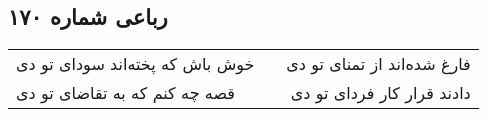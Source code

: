 \begin{center}
\section*{رباعی شماره ۱۷۰}
\label{sec:sh170}
\begin{longtable}{l p{0.5cm} r}
خوش باش که پخته‌اند سودای تو دی
&&
فارغ شده‌اند از تمنای تو دی
\\
قصه چه کنم که به تقاضای تو دی
&&
دادند قرار کار فردای تو دی
\\
\end{longtable}
\end{center}
